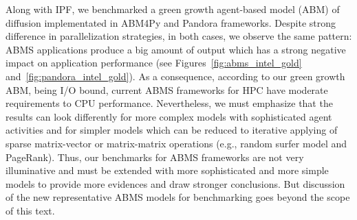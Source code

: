 Along  with IPF,
we benchmarked a green growth agent-based model (ABM) of diffusion implementated in \textsf{ABM4Py} and \textsf{Pandora} frameworks.
Despite strong difference in parallelization  strategies,
in  both  cases,  we  observe  the same pattern:
ABMS  applications produce  a  big  amount  of  output  which  has  a  strong  negative  impact  on  application performance
(see Figures~\ref{fig:abms_intel_gold} and~\ref{fig:pandora_intel_gold}).
As a consequence, according to our green growth ABM, being I/O bound,
current ABMS frameworks for HPC have moderate requirements to CPU performance.
Nevertheless, we must emphasize that the results can look differently for
more complex models with sophisticated agent activities
and for simpler models which can be reduced to iterative applying of sparse matrix-vector or matrix-matrix operations
(e.g., random surfer model and PageRank).
Thus, our benchmarks for ABMS frameworks are not very illuminative
and must  be  extended  with  more sophisticated and more simple models to provide more evidences and draw stronger conclusions.
But discussion of the new representative ABMS models for benchmarking goes beyond the scope of this text.




